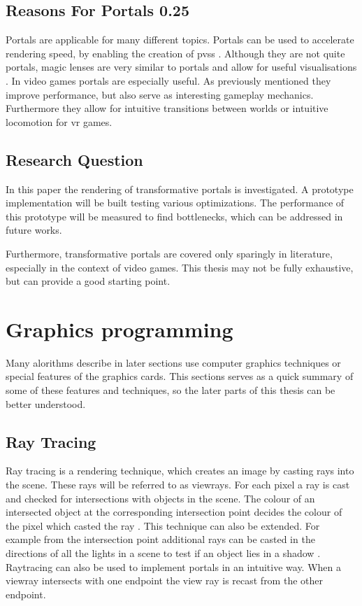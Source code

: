\subsection{Reasons For Portals 0.25}
Portals are applicable for many different topics. Portals can be used to accelerate rendering speed, by enabling the creation of \glspl{pvs} \cite{luebke:1995:portals}. Although they are not quite portals, magic lenses are very similar to portals and allow for useful visualisations \cite{viega:1996:3d}. In video games portals are especially useful. As previously mentioned they improve performance, but also serve as interesting gameplay mechanics. Furthermore they allow for intuitive transitions between worlds \cite{schmalstieg:1999:sewing} or intuitive locomotion for \gls{vr} games. 

\subsection{Research Question}

In this paper the rendering of transformative portals is investigated. A prototype implementation will be built testing various optimizations. The performance of this prototype will be measured to find bottlenecks, which can be addressed in future works.

Furthermore, transformative portals are covered only sparingly in literature, especially in the context of video games. This thesis may not be fully exhaustive, but can provide a good starting point. 


\section{Graphics programming}


Many alorithms describe in later sections use computer graphics techniques or special features of the graphics cards. This sections serves as a quick summary of some of these features and techniques, so the later parts of this thesis can be better understood. 


\subsection{Ray Tracing}
Ray tracing is a rendering technique, which creates an image by casting rays into the scene. These rays will be referred to as \glspl{viewray}. For each pixel a ray is cast and checked for intersections with objects in the scene. The colour of an intersected object at the corresponding intersection point decides the colour of the pixel which casted the ray \cite{bungartz:2002:einfuhrung}. This technique can also be extended. For example from the intersection point additional rays can be casted in the directions of all the lights in a scene to test if an object lies in a shadow \cite{whitted:2005:improved}. Raytracing can also be used to implement portals in an intuitive way. When a \gls{viewray} intersects with one \gls{endpoint} the view ray is recast from the other \gls{endpoint}.

